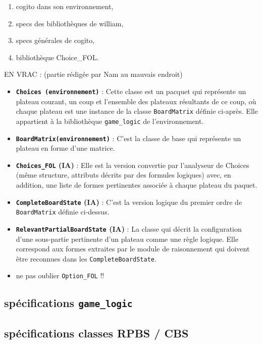 \begin{enumerate}
\item cogito dans son environnement,
\item specs des bibliothèques de william,
\item specs générales de cogito,
\item bibliothèque Choice\_FOL.
\end{enumerate}

EN VRAC :
(partie rédigée par Nam au mauvais endroit)

\begin{itemize}
  \item \textbf {\texttt{\gls{Choices} (environnement)}} : Cette classe est un pacquet qui représente un plateau courant, un coup et l'ensemble des plateaux résultants de ce coup, où chaque plateau est une instance de la classe \texttt{\gls{BoardMatrix}} définie ci-après. Elle appartient à la bibliothèque \texttt{\gls{game_logic}} de l'environnement.
  \item \textbf {\texttt{\gls{BoardMatrix}(environnement)}} : C'est la classe de base qui représente un plateau en forme d'une matrice. 
  \item \textbf {\texttt{\gls{Choices_FOL}} (IA)} : Elle est la version convertie par l'analyseur de Choices (même structure, attributs décrits par des formules logiques) avec, en addition, une liste de formes pertinentes associée à chaque plateau du paquet.
  \item \textbf {\texttt{\gls{CompleteBoardState}} (IA)} : C'est la version logique du premier ordre de
  \texttt{\gls{BoardMatrix}} définie ci-dessus.
  \item \textbf {\texttt{\gls{RelevantPartialBoardState}} (IA)} : La classe qui décrit la configuration d'une sous-partie pertinente d'un plateau comme une règle logique. Elle correspond aux \og formes \fg{} extraites par le module de raisonnement qui doivent être reconnues dans les \texttt{\gls{CompleteBoardState}}.
  \item ne pas oublier \texttt{\gls{Option_FOL}} !!
\end{itemize}

\subsection{spécifications \texttt{\gls{game_logic}}}
\label{specs_game_logic}
\subsection{spécifications classes RPBS / CBS}
\label{specs_shared_classes}

